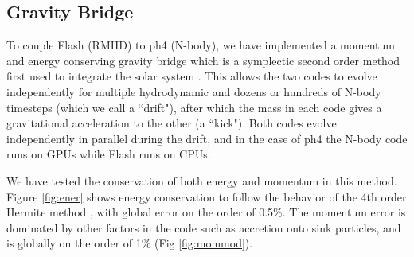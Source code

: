 \documentclass[11pt]{article}
\begin{document}




\subsection{Gravity Bridge}

To couple Flash (RMHD) to ph4 (N-body), we have implemented a momentum and energy conserving gravity bridge \citep{Fujii_Makino_bridge} which is a symplectic second order method first used to integrate the solar system \citep{Wisdom_Holman_1991}. This allows the two codes to evolve independently for multiple hydrodynamic and dozens or hundreds of N-body timesteps (which we call a ``drift"), after which the mass in each code gives a gravitational acceleration to the other (a ``kick"). Both codes evolve independently in parallel during the drift, and in the case of ph4 the N-body code runs on GPUs while Flash runs on CPUs. 

We have tested the conservation of both energy and momentum in this method. Figure \ref{fig:ener} shows energy conservation to follow the behavior of the 4th order Hermite method \citep{binney2011galactic}, with global error on the order of 0.5\%. The momentum error is dominated by other factors in the code such as accretion onto sink particles, and is globally on the order of 1\% (Fig \ref{fig:mommod}).
\end{document}
